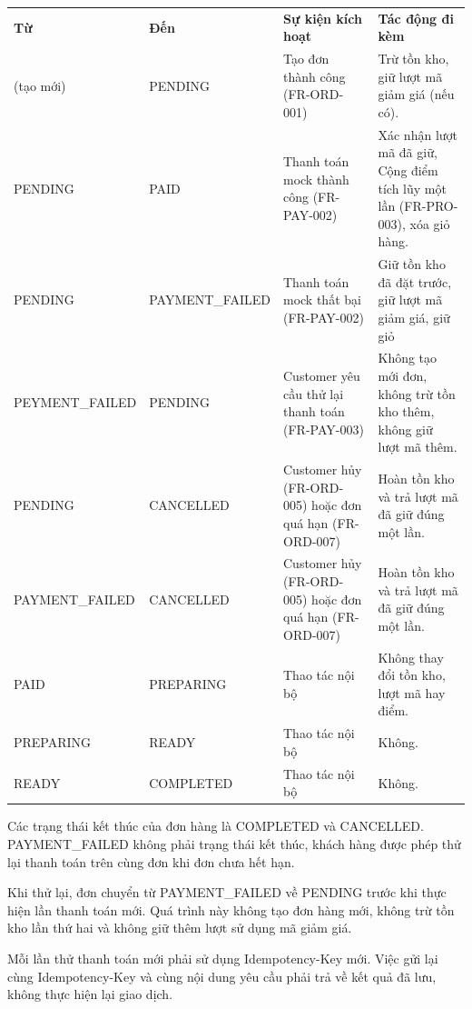 \documentclass[11pt,a4paper,oneside]{report}
\begin{document}
\begin{longtable}[]{@{}
  >{\raggedright\arraybackslash}p{}
  >{\raggedright\arraybackslash}p{}
  >{\raggedright\arraybackslash}p{}
  >{\raggedright\arraybackslash}p{}@{}}
\toprule\noalign{}
\endhead
\bottomrule\noalign{}
\endlastfoot
\textbf{Từ} & \textbf{Đến} & \textbf{Sự kiện kích hoạt} & \textbf{Tác động đi kèm} \\
(tạo mới) & PENDING & Tạo đơn thành công (FR-ORD-001) & Trừ tồn kho, giữ lượt mã giảm giá (nếu có). \\
PENDING & PAID & Thanh toán mock thành công (FR-PAY-002) & Xác nhận lượt mã đã giữ, Cộng điểm tích lũy một lần (FR-PRO-003), xóa giỏ hàng. \\
PENDING & PAYMENT\_FAILED & Thanh toán mock thất bại (FR-PAY-002) & Giữ tồn kho đã đặt trước, giữ lượt mã giảm giá, giữ giỏ \\
PEYMENT\_FAILED & PENDING & Customer yêu cầu thử lại thanh toán (FR-PAY-003) & Không tạo mới đơn, không trừ tồn kho thêm, không giữ lượt mã thêm. \\
PENDING & CANCELLED & Customer hủy (FR-ORD-005) hoặc đơn quá hạn (FR-ORD-007) & Hoàn tồn kho và trả lượt mã đã giữ đúng một lần. \\
PAYMENT\_FAILED & CANCELLED & Customer hủy (FR-ORD-005) hoặc đơn quá hạn (FR-ORD-007) & Hoàn tồn kho và trả lượt mã đã giữ đúng một lần. \\
PAID & PREPARING & Thao tác nội bộ & Không thay đổi tồn kho, lượt mã hay điểm. \\
PREPARING & READY & Thao tác nội bộ & Không. \\
READY & COMPLETED & Thao tác nội bộ & Không. \\
\end{longtable}

Các trạng thái kết thúc của đơn hàng là COMPLETED và CANCELLED. PAYMENT\_FAILED không phải trạng thái kết thúc, khách hàng được phép thử lại thanh toán trên cùng đơn khi đơn chưa hết hạn.

Khi thử lại, đơn chuyển từ PAYMENT\_FAILED về PENDING trước khi thực hiện lần thanh toán mới. Quá trình này không tạo đơn hàng mới, không trừ tồn kho lần thứ hai và không giữ thêm lượt sử dụng mã giảm giá.

Mỗi lần thử thanh toán mới phải sử dụng Idempotency-Key mới. Việc gửi lại cùng Idempotency-Key và cùng nội dung yêu cầu phải trả về kết quả đã lưu, không thực hiện lại giao dịch.
\end{document}
